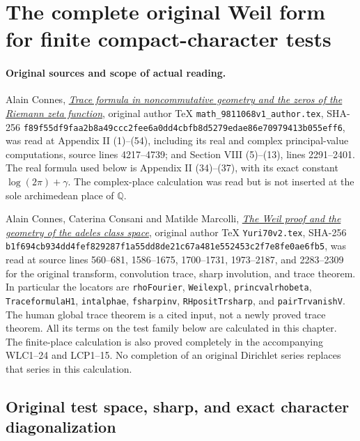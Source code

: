 \section{The complete original Weil form for finite compact-character tests}
\label{sec:complete-original-weil-form}

\paragraph{Original sources and scope of actual reading.}
Alain Connes, \href{https://arxiv.org/abs/math/9811068v1}
{\emph{Trace formula in noncommutative geometry and the zeros of the
Riemann zeta function}}, original author TeX
\nolinkurl{math_9811068v1_author.tex}, SHA-256
\nolinkurl{f89f55df9faa2b8a49ccc2fee6a0dd4cbfb8d5279edae86e70979413b055eff6},
was read at Appendix II (1)--(54), including its real and complex
principal-value computations, source lines 4217--4739; and Section
VIII (5)--(13), lines 2291--2401. The real formula used below is
Appendix II (34)--(37), with its exact constant
$\log(2\pi)+\gamma$. The complex-place calculation was read but is
not inserted at the sole archimedean place of $\mathbb Q$.

Alain Connes, Caterina Consani and Matilde Marcolli,
\href{https://arxiv.org/abs/math/0703392v1}
{\emph{The Weil proof and the geometry of the adeles class space}},
original author TeX \nolinkurl{Yuri70v2.tex}, SHA-256
\nolinkurl{b1f694cb934dd4fef829287f1a55dd8de21c67a481e552453c2f7e8fe0ae6fb5},
was read at source lines 560--681, 1586--1675, 1700--1731, 1973--2187,
and 2283--2309 for the original transform, convolution trace,
sharp involution, and trace theorem. In particular the locators are
\texttt{rhoFourier}, \texttt{Weilexpl}, \texttt{princvalrhobeta},
\texttt{TraceformulaH1}, \texttt{intalphae}, \texttt{fsharpinv},
\texttt{RHpositTrsharp}, and \texttt{pairTrvanishV}.
The human global trace theorem is a cited input, not a newly proved
trace theorem. All its terms on the test family below are calculated
in this chapter. The finite-place calculation is also proved completely
in the accompanying WLC1--24 and LCP1--15. No completion of an original
Dirichlet series replaces that series in this calculation.

\subsection{Original test space, sharp, and exact character diagonalization}

